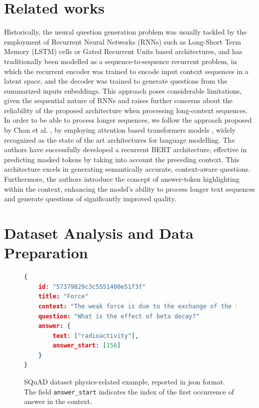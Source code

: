 \documentclass{article}
\begin{document}
\section{Related works}
Historically, the neural question generation problem was usually tackled by the employment of Recurrent Neural Networks (RNNs) such as Long-Short Term Memory (LSTM) \cite{lstm} cells or Gated Recurrent Units \cite{gru} based architectures, and has traditionally been modelled as a sequence-to-sequence recurrent problem, in which the recurrent encoder was trained to encode input context sequences in a latent space, and the decoder was trained to generate questions from the summarized inputs enbeddings. This approach poses considerable limitations, given the sequential nature of RNNs and raises further concerns about the reliability of the proposed architecture when processing long-context sequences. In order to be able to process longer sequences, we follow the approach proposed by Chan et al. \cite{chan-fan-2019-recurrent}, by employing attention based transformers models \cite{DBLP:journals/corr/VaswaniSPUJGKP17}, widely recognized as the state of the art architectures for language modelling. The authors have successfully developed a recurrent BERT architecture, effective in predicting masked tokens by taking into account the preceding context. This architecture excels in generating semantically accurate, context-aware questions. Furthermore, the authors introduce the concept of answer-token highlighting within the context, enhancing the model's ability to process longer text sequences and generate questions of significantly improved quality.

\section{Dataset Analysis and Data Preparation}

\begin{figure}[ht]
\begin{lstlisting}[language=json]
{   
    id: "57379829c3c5551400e51f3f"
    title: "Force" 
    context: "The weak force is due to the exchange of the heavy W and Z bosons. Its most familiar effect is beta decay (of neutrons in atomic nuclei) and the associated radioactivity. The word 'weak' derives from the fact that the field strength is some 1013 times less than that of the strong force. Still, it is stronger than gravity over short distances. A consistent electroweak theory has also been developed, which shows that electromagnetic forces and the weak force are indistinguishable at a temperatures in excess of approximately 1015 kelvins. Such temperatures have been probed in modern particle accelerators and show the conditions of the universe in the early moments of the Big Bang."
    question: "What is the effect of beta decay?"
    answer: { 
        text: ["radioactivity"], 
        answer_start: [156] 
    }
}
\end{lstlisting}
\caption{SQuAD dataset physics-related example, reported in json format. The field \texttt{answer\_start} indicates the index of the first occurrence of answer in the context. }
\label{lst:squad}
\end{figure}
\end{document}
